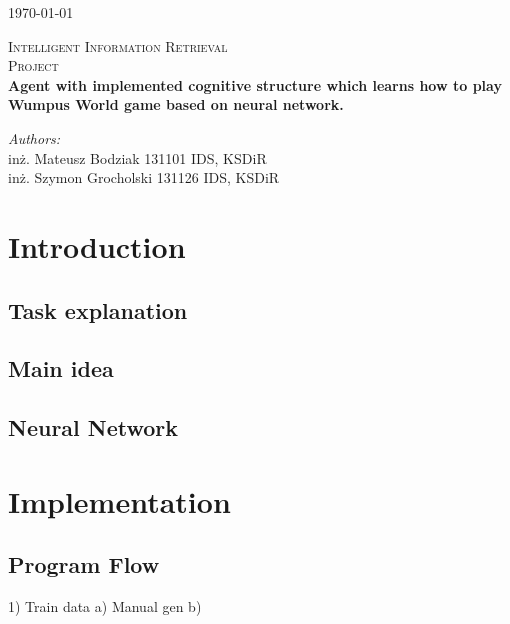 \documentclass[a4paper]{article}
\begin{document}
\begin{flushright}
{\large \today}
\end{flushright}

\begin{center}



\textsc{\LARGE Intelligent Information Retrieval }\\[1.5cm]

\textsc{\Large Project }\\[0.5cm]

{ \huge \bfseries Agent with implemented cognitive structure which learns how to play Wumpus World game based on neural network. \\[0.4cm] }


\end{center}
\begin{minipage}{0.7\textwidth}
\begin{flushleft} \large
\emph{Authors:}\\
inż. Mateusz Bodziak 131101 IDS, KSDiR\\
inż. Szymon Grocholski 131126 IDS, KSDiR\\

\end{flushleft}
\end{minipage}

\section{Introduction}
	\subsection{Task explanation}
	\subsection{Main idea}
	\subsection{Neural Network}

\section{Implementation }
	\subsection{Program Flow}
		1) Train data	 a) Manual gen
				b) 
\end{document}
